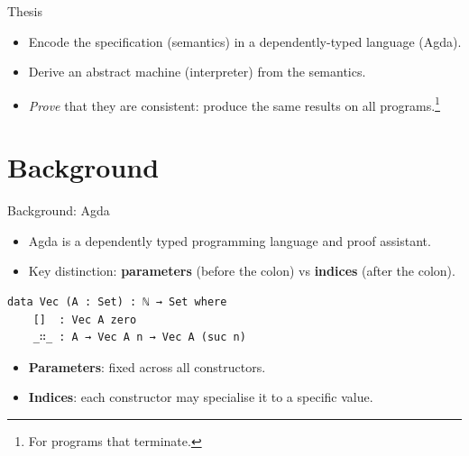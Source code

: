 \documentclass[10pt,compress,aspectratio=169]{beamer}
\begin{document}
\begin{frame}{Thesis}
\begin{itemize}
    \item Encode the specification (semantics) in a dependently-typed language (Agda).
    \item Derive an abstract machine (interpreter) from the semantics.
    \item \emph{Prove} that they are consistent: produce the same results on all programs.\footnote{For programs that terminate.}
\end{itemize}
\end{frame}

\section{Background}
\begin{frame}[fragile]{Background: Agda}
\begin{itemize}
    \item Agda is a dependently typed programming language and proof assistant.
    \item Key distinction: \textbf{parameters} (before the colon) vs \textbf{indices} (after the colon).
\end{itemize}
\vspace{0.5ex}
\begin{verbatim}
data Vec (A : Set) : ℕ → Set where
    []  : Vec A zero
    _∷_ : A → Vec A n → Vec A (suc n)
\end{verbatim}
\begin{itemize}
    \item \textbf{Parameters}: fixed across all constructors.
    \item \textbf{Indices}: each constructor may specialise it to a specific value.
\end{itemize}
\end{frame}
\end{document}

